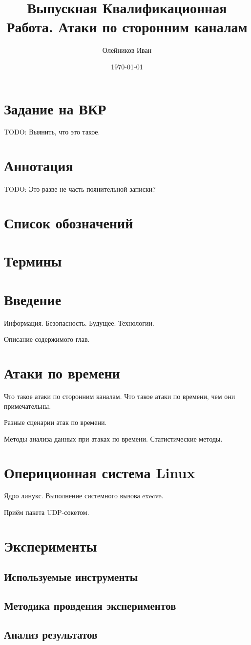 \documentclass[11pt,twoside,a4paper]{report}
\begin{document}
\title{Выпускная Квалификационная Работа. Атаки по сторонним каналам}
\author{Олейников Иван}
\date{\today}
\maketitle

\chapter*{Задание на ВКР}

TODO: Выянить, что это такое.

\chapter*{Аннотация}

TODO: Это разве не часть поянительной записки?

\chapter*{Список обозначений}

\chapter*{Термины}

\chapter*{Введение}

Информация. Безопасность. Будущее. Технологии.

Описание содержимого глав.

\chapter{Атаки по времени}

Что такое атаки по сторонним каналам. Что такое атаки по времени, чем они примечательны.

Разные сценарии атак по времени.

Методы анализа данных при атаках по времени. Статистические методы.

\chapter{Опериционная система Linux}

Ядро линукс. Выполнение системного вызова execve.

Приём пакета UDP-сокетом.

\chapter{Эксперименты}

\section{Используемые инструменты}

\section{Методика провдения экспериментов}

\section{Анализ результатов}
\end{document}
